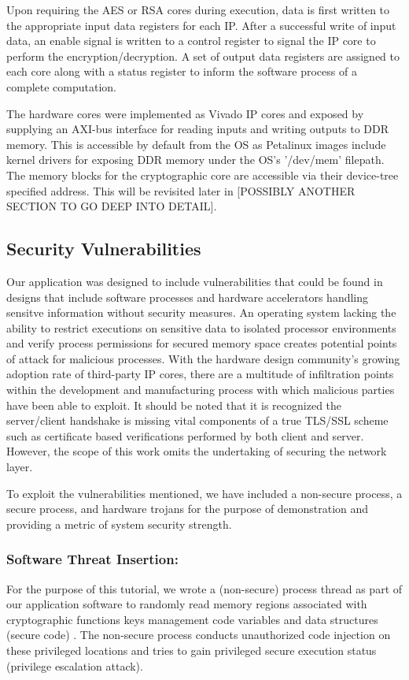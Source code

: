 \documentclass[sigconf]{acmart}
\theoremstyle{plain}
\theoremstyle{remark}
\begin{document}
Upon requiring the AES or RSA cores during execution, data is first written to the appropriate input data registers for each IP. After a successful write of input data, an enable signal is written to a control register to signal the IP core to perform the encryption/decryption. A set of output data registers are assigned to each core along with a status register to inform the software process of a complete computation.

The hardware cores were implemented as Vivado IP cores and exposed by supplying an AXI-bus interface for reading inputs and writing outputs to DDR memory. This is accessible by default from the OS as Petalinux images include kernel drivers for exposing DDR memory under the OS's '/dev/mem' filepath. The memory blocks for the cryptographic core are accessible via their device-tree specified address. This will be revisited later in [POSSIBLY ANOTHER SECTION TO GO DEEP INTO DETAIL].




\subsection{Security Vulnerabilities}

Our application was designed to include vulnerabilities that could be found in designs that include software processes and hardware accelerators handling sensitve information without security measures. An operating system lacking the ability to restrict executions on sensitive data to isolated processor environments and verify process permissions for secured memory space creates potential points of attack for malicious processes. With the hardware design community's growing adoption rate of third-party IP cores, there are a multitude of infiltration points within the development and manufacturing process with which malicious parties have been able to exploit. It should be noted that it is recognized the server/client handshake is missing vital components of a true TLS/SSL scheme such as certificate based verifications performed by both client and server. However, the scope of this work omits the undertaking of securing the network layer.

To exploit the vulnerabilities mentioned, we have included a non-secure process, a secure process, and  hardware trojans for the purpose of demonstration and providing a metric of system security strength.

\subsubsection{Software Threat Insertion:}
For the purpose of this tutorial, we wrote a (non-secure) process thread as part of our application software to randomly read memory regions associated with cryptographic functions keys management code variables and data structures (secure code) . The non-secure process conducts unauthorized code injection on these privileged locations and tries to gain privileged secure execution status (privilege escalation attack).  
\end{document}
